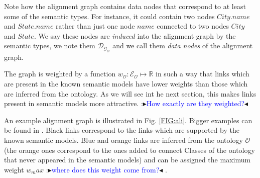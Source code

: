 \documentclass[letterpaper]{article} %
\newcommand{\authornote}[3]{
  {\fbox{\sc 
  #1}:$\blacktriangleright$\textcolor{#2}{\small{#3}}$\blacktriangleleft$}%
}
\newcommand{\ddg}[1]{\authornote{DDG}{blue}{#1}}
\begin{document}
Note how the alignment graph contains data nodes that correspond to at least 
some of the semantic types. For instance, it could contain two nodes 
$City.name$ and $State.name$ rather than just one node $name$ connected to two 
nodes $City$ and $State$. We say these nodes are \emph{induced} into the 
alignment graph by the semantic types, we note them $\mathcal{D_{G_O}}$ and we 
call them \emph{data nodes} of the alignment graph.

The graph is weighted by a function $w_\mathcal{O} : \mathcal{E_O} \mapsto 
\mathbb{R}$ in 
such a way that links which are present in
the known semantic models have lower weights than those 
which are inferred from the ontology. As we will see int he next section, this 
makes links present in semantic models more attractive. \ddg{How exactly are 
they weighted?}

An example alignment graph is illustrated in Fig. \ref{FIG:ali}. Bigger 
examples 
can be found in \cite{Taheriyan2013}. Black links 
correspond to the links which are supported by the known semantic models. Blue 
and orange links are inferred from the ontology $\mathcal{O}$ (the orange ones 
correspond to the ones added to connect Classes of the ontology that never 
appeared in the semantic models) and can be assigned the 
maximum weight $w_max$ \ddg{where does this weight come from?} .
\end{document}
